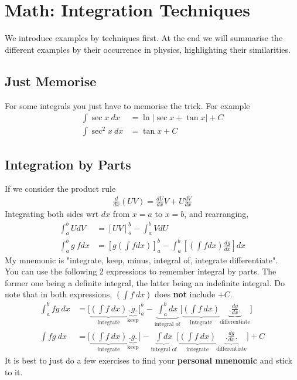 \documentclass{article}
\begin{document}
\section{Math: Integration Techniques}
We introduce examples by techniques first. At the end we will summarise the different examples by their occurrence in physics, highlighting their similarities.
\subsection{Just Memorise}
For some integrals you just have to memorise the trick. For example
\begin{align}
    \int \sec x\ dx &= \ln |\sec x + \tan x| + C \\
    \int \sec^2 x\ dx &= \tan x + C 
\end{align}
\subsection{Integration by Parts}
If we consider the product rule
\begin{align}
    \frac{d}{dx} (UV) = \frac{dU}{dx} V + U \frac{dV}{dx}
\end{align}
Integrating both sides wrt $dx$ from $x=a$ to $x=b$, and rearranging,
\begin{align}
    \int_a^b U d V&=[U V]_a^b-\int_a^b V d U \\
    \int_a^b g \ f dx &= \left[ g\left(\int f dx \right) \right]_a^b - \int_a^b \left[ \left(\int f dx \right) \frac{dg}{dx}\right] dx 
\end{align}
My mnemonic is "integrate, keep, minus, integral of, integrate differentiate".\\[10pt]
You can use the following 2 expressions to remember integral by parts. The former one being a definite integral, the latter being an indefinite integral. Do note that in both expressions, $\displaystyle \left( \int f\ dx \right)$ does \textbf{not} include $+C$.
\begin{align}
    \int_a^b f g \ dx &= \Biggl[ \underbrace{\left(\int f\ dx \right)}_{\text{integrate}} \underbrace{\biggl. g \biggr.}_{\text{keep}} \Biggr]_a^b - \underbrace{\int_a^b dx }_{\text{integral of}}\Biggl[ \underbrace{\left(\int f\ dx \right)}_{\text{integrate}} \underbrace{\biggl.\frac{dg}{dx}\biggr.}_{\text{differentiate}}\Biggr] \\
    \int f g \ dx &= \Biggl[ \underbrace{\left(\int f\ dx \right)}_{\text{integrate}} \underbrace{\biggl. g \biggr.}_{\text{keep}} \Biggr] - \underbrace{\int dx }_{\text{integral of}}\Biggl[ \underbrace{\left(\int f\ dx \right)}_{\text{integrate}} \underbrace{\biggl.\frac{dg}{dx}\biggr.}_{\text{differentiate}}\Biggr] + C
\end{align}
It is best to just do a few exercises to find your \textbf{personal mnenomic} and stick to it.
\end{document}

